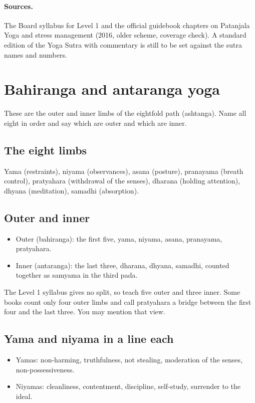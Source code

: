 \paragraph{Sources.} The Board syllabus for Level 1 and the official guidebook chapters on Patanjala Yoga and stress management (2016, older scheme, coverage check). A standard edition of the Yoga Sutra with commentary is still to be set against the sutra names and numbers.

\section{Bahiranga and antaranga yoga}
\label{sec:bahiranga-antaranga}

These are the outer and inner limbs of the eightfold path (ashtanga). Name all eight in order and say which are outer and which are inner.

\subsection*{The eight limbs}
Yama (restraints), niyama (observances), asana (posture), pranayama (breath control), pratyahara (withdrawal of the senses), dharana (holding attention), dhyana (meditation), samadhi (absorption).

\subsection*{Outer and inner}
\begin{itemize}
\item Outer (bahiranga): the first five, yama, niyama, asana, pranayama, pratyahara.
\item Inner (antaranga): the last three, dharana, dhyana, samadhi, counted together as samyama in the third pada.
\end{itemize}
The Level 1 syllabus gives no split, so teach five outer and three inner. Some books count only four outer limbs and call pratyahara a bridge between the first four and the last three. You may mention that view.

\subsection*{Yama and niyama in a line each}
\begin{itemize}
\item Yamas: non-harming, truthfulness, not stealing, moderation of the senses, non-possessiveness.
\item Niyamas: cleanliness, contentment, discipline, self-study, surrender to the ideal.
\end{itemize}


